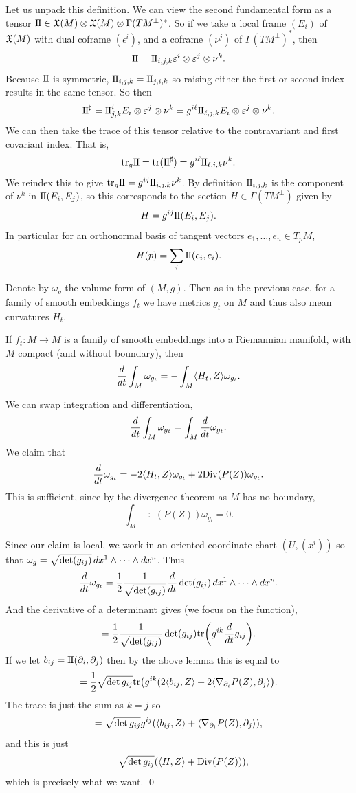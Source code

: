 Let us unpack this definition.
We can view the second fundamental form as a tensor ${\rm I\mkern-1mu\relax I}\in{\frak X}(M)\otimes{\frak X}(M)\otimes\Gamma(TM^\perp)^*$.
So if we take a local frame $(E_i)$ of ${\frak X}(M)$ with dual coframe $(\epsilon^i)$, and a coframe $(\nu^j)$ of $\Gamma(TM^\perp)^*$, then
$$ {\rm I\mkern-1mu\relax I} = {\rm I\mkern-1mu\relax I}_{i,j,k}\varepsilon^i\otimes\varepsilon^j\otimes\nu^k . $$
Because ${\rm I\mkern-1mu\relax I}$ is symmetric, ${\rm I\mkern-1mu\relax I}_{i,j,k}={\rm I\mkern-1mu\relax I}_{j,i,k}$ so raising either the first or second index results in the same tensor.
So then
$$ {\rm I\mkern-1mu\relax I}^\sharp = {\rm I\mkern-1mu\relax I}^i_{j,k}E_i\otimes\varepsilon^j\otimes\nu^k = g^{i\ell}{\rm I\mkern-1mu\relax I}_{\ell,j,k}E_i\otimes\varepsilon^j\otimes\nu^k . $$
We can then take the trace of this tensor relative to the contravariant and first covariant index.
That is,
$$ {\rm tr}_g{\rm I\mkern-1mu\relax I} = {\rm tr}({\rm I\mkern-1mu\relax I}^\sharp) = g^{i\ell}{\rm I\mkern-1mu\relax I}_{\ell,i,k}\nu^k . $$
We reindex this to give ${\rm tr}_g{\rm I\mkern-1mu\relax I}=g^{ij}{\rm I\mkern-1mu\relax I}_{i,j,k}\nu^k$.
By definition ${\rm I\mkern-1mu\relax I}_{i,j,k}$ is the component of $\nu^k$ in ${\rm I\mkern-1mu\relax I}(E_i,E_j)$, so this corresponds to the section $H\in\Gamma(TM^\perp)$ given by
$$ H = g^{ij}{\rm I\mkern-1mu\relax I}(E_i,E_j) . $$
In particular for an orthonormal basis of tangent vectors $e_1,\dots,e_n\in T_pM$,
$$ H(p) = \sum_i{\rm I\mkern-1mu\relax I}(e_i,e_i) . $$

Denote by $\omega_g$ the volume form of $(M,g)$.
Then as in the previous case, for a family of smooth embeddings $f_t$ we have metrics $g_t$ on $M$ and thus also mean curvatures $H_t$.

\bthrm

    If $f_t\colon M\to\bar M$ is a family of smooth embeddings into a Riemannian manifold, with $M$ compact (and without boundary), then
    $$ {{d}\over{dt}}\int_M\omega_{g_t} = -\int_M\mathopen{}\mathclose{\left<H_t,Z\right>}\omega_{g_t} . $$

\ethrm

\bproof

    We can swap integration and differentiation,
    $$ {{d}\over{dt}}\int_M\omega_{g_t} = \int_M{{d}\over{dt}}\omega_{g_t} . $$
    We claim that
    $$ {{d}\over{dt}}\omega_{g_t} = -2\mathopen{}\mathclose{\left<H_t,Z\right>}\omega_{g_t} + 2{\rm Div}(P(Z))\omega_{g_t} . $$
    This is sufficient, since by the divergence theorem as $M$ has no boundary,
    $$ \int_M\div(P(Z))\omega_{g_t} = 0 . $$

    Since our claim is local, we work in an oriented coordinate chart $(U,(x^i))$ so that
    $\omega_g=\sqrt{\mathop{\rm det}\nolimits(g_{ij})}\mathop{}\!d x^1\wedge\cdots\wedge\mathop{}\!d x^n$.
    Thus
    $$ {{d}\over{dt}}\omega_{g_t} = {{1}\over{2}}{{1}\over{\sqrt{\mathop{\rm det}\nolimits(g_{ij})}}}{{d}\over{dt}}\mathop{\rm det}\nolimits(g_{ij})\mathop{}\!d x^1\wedge\cdots\wedge\mathop{}\!d x^n . $$
    And the derivative of a determinant gives (we focus on the function),
    $$ = {{1}\over{2}}{{1}\over{\sqrt{\mathop{\rm det}\nolimits(g_{ij})}}}\mathop{\rm det}\nolimits(g_{ij}){\rm tr}\mathopen{}\mathclose{\left(g^{ik}{{d}\over{dt}}g_{ij}\right)} . $$
    If we let $b_{ij}={\rm I\mkern-1mu\relax I}(\partial_i,\partial_j)$ then by the above lemma this is equal to
    $$ = {{1}\over{2}}\sqrt{\mathop{\rm det}\nolimits g_{ij}}{\rm tr}\mathopen{}\mathclose{\left(g^{ik}(2\mathopen{}\mathclose{\left<b_{ij},Z\right>} + 2\mathopen{}\mathclose{\left<\nabla_{\partial_i}P(Z),\partial_j\right>}\right)} . $$
    The trace is just the sum as $k=j$ so
    $$ = \sqrt{\mathop{\rm det}\nolimits g_{ij}}g^{ij}\mathopen{}\mathclose{\left(\mathopen{}\mathclose{\left<b_{ij},Z\right>} + \mathopen{}\mathclose{\left<\nabla_{\partial_i}P(Z),\partial_j\right>}\right)} , $$
    and this is just
    $$ = \sqrt{\mathop{\rm det}\nolimits g_{ij}}\mathopen{}\mathclose{\left(\mathopen{}\mathclose{\left<H,Z\right>} + {\rm Div}(P(Z))\right)} , $$
    which is precisely what we want.
    \qed

